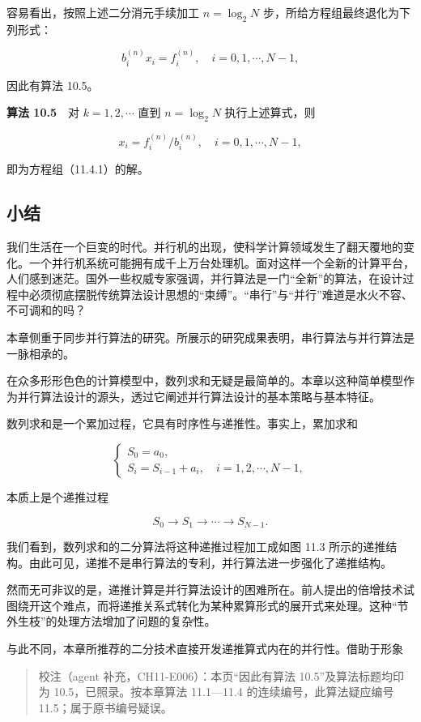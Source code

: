 容易看出，按照上述二分消元手续加工 \(n=\log_2 N\) 步，所给方程组最终退化为下列形式：

\[
b_i^{(n)}x_i=f_i^{(n)},\quad i=0,1,\cdots,N-1,
\]

因此有算法 10.5。

\textbf{算法 10.5}　对 \(k=1,2,\cdots\) 直到 \(n=\log_2 N\) 执行上述算式，则

\[
x_i=f_i^{(n)}/b_i^{(n)},\quad i=0,1,\cdots,N-1,
\]

即为方程组（11.4.1）的解。

\subsection{小结}\label{ch11-ux5c0fux7ed3}

我们生活在一个巨变的时代。并行机的出现，使科学计算领域发生了翻天覆地的变化。一个并行机系统可能拥有成千上万台处理机。面对这样一个全新的计算平台，人们感到迷茫。国外一些权威专家强调，并行算法是一门``全新''的算法，在设计过程中必须彻底摆脱传统算法设计思想的``束缚''。``串行''与``并行''难道是水火不容、不可调和的吗？

本章侧重于同步并行算法的研究。所展示的研究成果表明，串行算法与并行算法是一脉相承的。

在众多形形色色的计算模型中，数列求和无疑是最简单的。本章以这种简单模型作为并行算法设计的源头，透过它阐述并行算法设计的基本策略与基本特征。

数列求和是一个累加过程，它具有时序性与递推性。事实上，累加求和

\[
\begin{cases}
S_0=a_0,\\
S_i=S_{i-1}+a_i,\quad i=1,2,\cdots,N-1,
\end{cases}
\]

本质上是个递推过程

\[
S_0\to S_1\to\cdots\to S_{N-1}.
\]

我们看到，数列求和的二分算法将这种递推过程加工成如图 11.3 所示的递推结构。由此可见，递推不是串行算法的专利，并行算法进一步强化了递推结构。

然而无可非议的是，递推计算是并行算法设计的困难所在。前人提出的倍增技术试图绕开这个难点，而将递推关系式转化为某种累算形式的展开式来处理。这种``节外生枝''的处理方法增加了问题的复杂性。

与此不同，本章所推荐的二分技术直接开发递推算式内在的并行性。借助于形象

\begin{quote}
校注（agent 补充，CH11-E006）：本页``因此有算法 10.5''及算法标题均印为 10.5，已照录。按本章算法 11.1---11.4 的连续编号，此算法疑应编号 11.5；属于原书编号疑误。
\end{quote}

